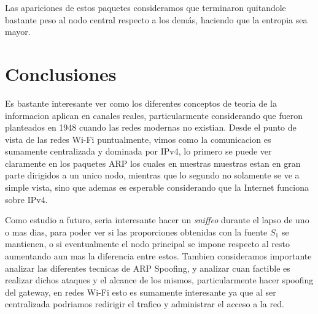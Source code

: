 Las apariciones de estos paquetes consideramos que terminaron quitandole bastante peso al nodo central respecto a los demás, haciendo que la entropia sea mayor.

\section{Conclusiones}

Es bastante interesante ver como los diferentes conceptos de teoria de la informacion aplican en canales reales, particularmente considerando que fueron planteados en 1948 cuando las redes modernas no existian. Desde el punto de vista de las redes Wi-Fi puntualmente, vimos como la comunicacion es sumamente centralizada y dominada por IPv4, lo primero se puede ver claramente en los paquetes ARP los cuales en nuestras muestras estan en gran parte dirigidos a un unico nodo, mientras que lo segundo no solamente se ve a simple vista, sino que ademas es esperable considerando que la Internet funciona sobre IPv4.

Como estudio a futuro, seria interesante hacer un \textit{sniffeo} durante el lapso de uno o mas dias, para poder ver si las proporciones obtenidas con la fuente $S_1$ se mantienen, o si eventualmente el nodo principal se impone respecto al resto aumentando aun mas la diferencia entre estos. Tambien consideramos importante analizar las diferentes tecnicas de ARP Spoofing, y analizar cuan factible es realizar dichos ataques y el alcance de los mismos, particularmente hacer spoofing del gateway, en redes Wi-Fi esto es sumamente interesante ya que al ser centralizada podriamos redirigir el trafico y administrar el acceso a la red.
%
%
